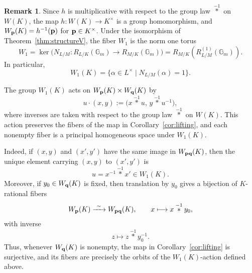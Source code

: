 \documentclass[a4paper, 11pt]{amsart}
\theoremstyle{plain}
\theoremstyle{definition}
\newtheorem{remark}[thm]{Remark}
\numberwithin{equation}{section}
\begin{document}
\begin{remark}\label{rem:fibers}
Since $h$ is multiplicative with respect to the group law $\overset{-1}{\ast}$
on $W(K)$, the map $h:W(K)\to K^\times$ is a group homomorphism, and
$W_{\bf p}(K)=h^{-1}({\bf p})$ for ${\bf p} \in K^{\times}$.
Under the isomorphism of Theorem~\ref{thm:structureV}, the fiber $W_1$ is the
norm one torus
\[
W_1=
\ker\bigl(N_{L/M}:R_{L/K}(\mathbb{G}_m)\longrightarrow R_{M/K}(\mathbb{G}_m)\bigr)=R_{M/K}(R_{L/M}^{(1)}(\mathbb{G}_m)).
\]
In particular,
\[
W_1(K)=\{\alpha\in L^\times\mid N_{L/M}(\alpha)=1\}.
\]

The group $W_1(K)$ acts on $W_{\bf p}(K)\times W_{\bf q}(K)$ by
\[
u\cdot(x,y):=
\bigl(x\overset{-1}{\ast}u,\,
y\overset{-1}{\ast}u^{-1}\bigr),
\]
where inverses are taken with respect to the group law $\overset{-1}{\ast}$ on
$W(K)$. 
This action preserves the fibers of the map in
Corollary~\ref{cor:lifting}, and each nonempty fiber is a principal homogeneous
space under $W_1(K)$.

Indeed, if $(x,y)$ and $(x',y')$ have the same image in $W_{{\bf p}{\bf q}}(K)$, then the
unique element carrying $(x,y)$ to $(x',y')$ is
\[
u=x^{-1}\overset{-1}{\ast}x'\in W_1(K).
\]
Moreover, if $y_0\in W_{\bf q}(K)$ is fixed, then translation by $y_0$ gives a
bijection of $K$-rational fibers
\[
W_{\bf p}(K)\xrightarrow{\ \sim\ }W_{{\bf p}{\bf q}}(K),\qquad
x\longmapsto x\overset{-1}{\ast}y_0,
\]
with inverse
\[
z\longmapsto z\overset{-1}{\ast}y_0^{-1}.
\]
Thus, whenever $W_{\bf q}(K)$ is nonempty, the map in Corollary~\ref{cor:lifting} is
surjective, and its fibers are precisely the orbits of the $W_1(K)$-action
defined above.
\end{remark}
\end{document}
